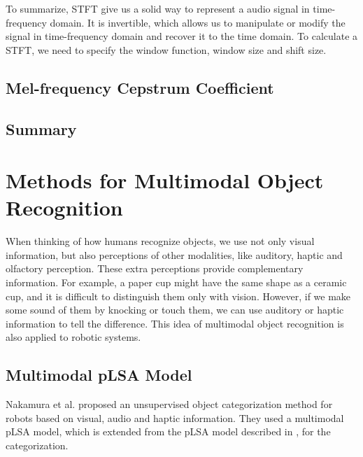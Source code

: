 \documentclass[12pt,final,twoside]{report}
\theoremstyle{plain}
\theoremstyle{definition}
\theoremstyle{remark}
\begin{document}
To summarize, STFT give us a solid way to represent a audio signal in time-frequency domain. It is invertible, which allows us to manipulate or modify the signal in time-frequency domain and recover it to the time domain. To calculate a STFT, we need to specify the window function, window size and shift size.


\section{Mel-frequency Cepstrum Coefficient}

\section{Summary}

\cleardoublepage
\chapter{Methods for Multimodal Object Recognition}
When thinking of how humans recognize objects, we use not only visual information, but also perceptions of other modalities, like auditory, haptic and olfactory perception. These extra perceptions provide complementary information. For example, a paper cup might have the same shape as a ceramic cup, and it is difficult to distinguish them only with vision. However, if we make some sound of them by knocking or touch them, we can use auditory or haptic information to tell the difference. This idea of multimodal object recognition is also applied to robotic systems.

\section{Multimodal pLSA Model}
Nakamura et al. \cite{nakamura_multimodal_2007} proposed an unsupervised object categorization method for robots based on visual, audio and haptic information. They used a multimodal pLSA model, which is extended from the pLSA model described in \cite{sivic_discovering_2005}, for the categorization.
\end{document}
